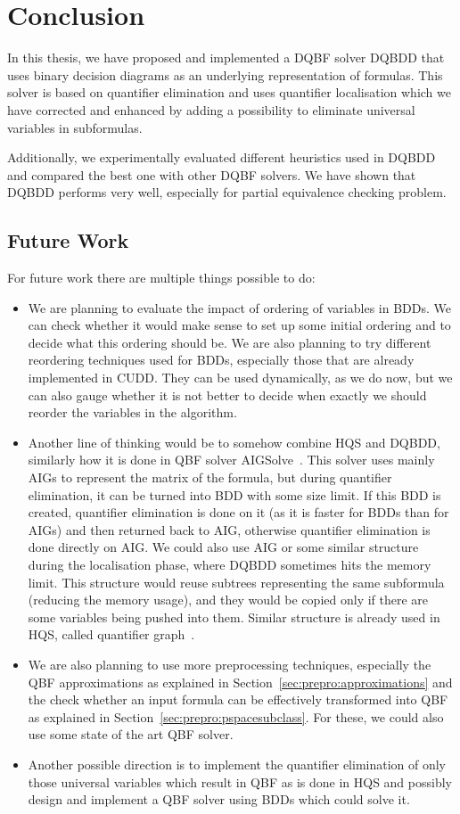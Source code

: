 \documentclass[
  digital, %
  color,
  twoside, %
  table,   %
  nolof,     %
  nolot,     %
]{fithesis3}
\theoremstyle{definition}
\theoremstyle{remark}
\begin{document}
\chapter{Conclusion}
In this thesis, we have proposed and implemented a DQBF solver DQBDD that uses binary decision diagrams as an underlying representation of formulas. This solver is based on quantifier elimination and uses quantifier localisation which we have corrected and enhanced by adding a possibility to eliminate universal variables in subformulas.

Additionally, we experimentally evaluated different heuristics used in DQBDD and compared the best one with other DQBF solvers. We have shown that DQBDD performs very well, especially for partial equivalence checking problem.

\section{Future Work}

For future work there are multiple things possible to do:
\begin{itemize}
  \item We are planning to evaluate the impact of ordering of variables in BDDs. We can check whether it would make sense to set up some initial ordering and to decide what this ordering should be. We are also planning to try different reordering techniques used for BDDs, especially those that are already implemented in CUDD. They can be used dynamically, as we do now, but we can also gauge whether it is not better to decide when exactly we should reorder the variables in the algorithm.
  \item Another line of thinking would be to somehow combine HQS and DQBDD, similarly how it is done in QBF solver AIGSol\-ve~\cite{AIGSolve}. This solver uses mainly AIGs to represent the matrix of the formula, but during quantifier elimination, it can be turned into BDD with some size limit. If this BDD is created, quantifier elimination is done on it (as it is faster for BDDs than for AIGs) and then returned back to AIG, otherwise quantifier elimination is done directly on AIG. We could also use AIG or some similar structure during the localisation phase, where DQBDD sometimes hits the memory limit. This structure would reuse subtrees representing the same subformula (reducing the memory usage), and they would be copied only if there are some variables being pushed into them. Similar structure is already used in HQS, called quantifier graph~\cite{HQSquantifierLocalisation}.
  \item We are also planning to use more preprocessing techniques, especially the QBF approximations as explained in Section~\ref{sec:prepro:approximations} and the check whether an input formula can be effectively transformed into QBF as explained in Section~\ref{sec:prepro:pspacesubclass}. For these, we could also use some state of the art QBF solver.
  \item Another possible direction is to implement the quantifier elimination of only those universal variables which result in QBF as is done in HQS and possibly design and implement a QBF solver using BDDs which could solve it.
\end{itemize}
\end{document}
